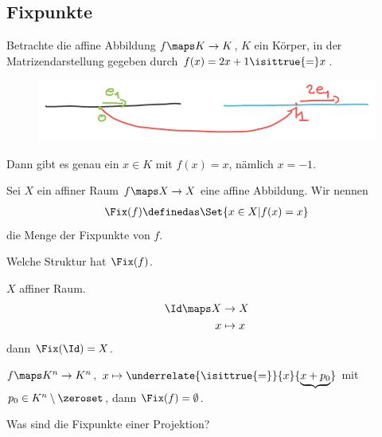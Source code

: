 \subsection*{Fixpunkte}
\begin{beispiel}
    Betrachte die affine Abbildung \( f\maps K\to K \), \( K \) ein Körper, in der Matrizendarstellung gegeben durch \( f(x)=2x+1\isittrue{=}x \).
    \begin{figure}[H]
        \centering
        \includegraphics[width=0.5\linewidth]{figures/affiner_fixpunkt_1_d}
        \label{fig:affiner_fixpunkt_1_d}
    \end{figure}
    Dann gibt es genau ein \( x\in K \) mit \( f(x)=x \), nämlich \( x=-1 \).
\end{beispiel}
\begin{definition*}
    Sei \( X \) ein affiner Raum \( f\maps X\to X \) eine affine Abbildung. Wir nennen
    \begin{align*}
        \Fix(f)\definedas \Set{x\in X|f(x)=x}
    \end{align*}
    die Menge der Fixpunkte von \( f \).
\end{definition*}
\begin{frage*}
    Welche Struktur hat \( \Fix(f) \).
\end{frage*}
\begin{beispiel}
    \( X \) affiner Raum.
    \begin{align*}
        \Id\maps \begin{aligned}[t]
            X&\to X\\
            x&\mapsto x
        \end{aligned}
    \end{align*}
    dann \( \Fix(\Id)=X \).
\end{beispiel}
\begin{beispiel}
    \( f\maps K^n\to K^n \), \( x\mapsto \underrelate{\isittrue{=}}{x}{\underbrace{x+p_0}} \) mit \( p_0\in K^n\setminus \zeroset \), dann \( \Fix(f)=\emptyset \).
\end{beispiel}
\begin{beispiel}
    \begin{frage*}
        Was sind die Fixpunkte einer Projektion?
    \end{frage*}
    
\end{beispiel}

